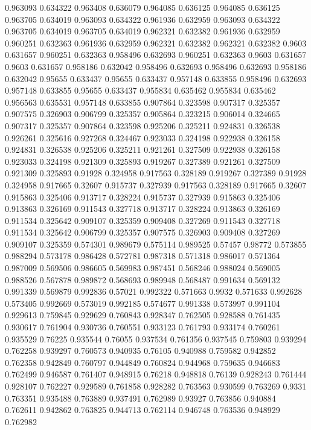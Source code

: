 0.963093 0.634322
0.963408 0.636079
0.964085 0.636125
0.964085 0.636125
0.963705 0.634019
0.963093 0.634322
0.961936 0.632959
0.963093 0.634322
0.963705 0.634019
0.963705 0.634019
0.962321 0.632382
0.961936 0.632959
0.960251 0.632363
0.961936 0.632959
0.962321 0.632382
0.962321 0.632382
0.9603 0.631657
0.960251 0.632363
0.958496 0.632693
0.960251 0.632363
0.9603 0.631657
0.9603 0.631657
0.958186 0.632042
0.958496 0.632693
0.958496 0.632693
0.958186 0.632042
0.95655 0.633437
0.95655 0.633437
0.957148 0.633855
0.958496 0.632693
0.957148 0.633855
0.95655 0.633437
0.955834 0.635462
0.955834 0.635462
0.956563 0.635531
0.957148 0.633855
0.907864 0.323598
0.907317 0.325357
0.907575 0.326903
0.906799 0.325357
0.905864 0.323215
0.906014 0.324665
0.907317 0.325357
0.907864 0.323598
0.925206 0.325211
0.924831 0.326538
0.926261 0.325616
0.927268 0.324467
0.923033 0.324198
0.922938 0.326158
0.924831 0.326538
0.925206 0.325211
0.921261 0.327509
0.922938 0.326158
0.923033 0.324198
0.921309 0.325893
0.919267 0.327389
0.921261 0.327509
0.921309 0.325893
0.91928 0.324958
0.917563 0.328189
0.919267 0.327389
0.91928 0.324958
0.917665 0.32607
0.915737 0.327939
0.917563 0.328189
0.917665 0.32607
0.915863 0.325406
0.913717 0.328224
0.915737 0.327939
0.915863 0.325406
0.913863 0.326169
0.911543 0.327718
0.913717 0.328224
0.913863 0.326169
0.911534 0.325642
0.909107 0.325359
0.909408 0.327269
0.911543 0.327718
0.911534 0.325642
0.906799 0.325357
0.907575 0.326903
0.909408 0.327269
0.909107 0.325359
0.574301 0.989679
0.575114 0.989525
0.57457 0.98772
0.573855 0.988294
0.573178 0.986428
0.572781 0.987318
0.571318 0.986017
0.571364 0.987009
0.569506 0.986605
0.569983 0.987451
0.568246 0.988024
0.569005 0.988526
0.567878 0.989872
0.568693 0.989948
0.568487 0.991634
0.569132 0.991339
0.569879 0.992836
0.57021 0.992322
0.571663 0.9932
0.571633 0.992628
0.573405 0.992669
0.573019 0.992185
0.574677 0.991338
0.573997 0.991104
0.929613 0.759845
0.929629 0.760843
0.928347 0.762505
0.928588 0.761435
0.930617 0.761904
0.930736 0.760551
0.933123 0.761793
0.933174 0.760261
0.935529 0.76225
0.935544 0.76055
0.937534 0.761356
0.937545 0.759803
0.939294 0.762258
0.939297 0.760573
0.940935 0.76105
0.940988 0.759582
0.942852 0.762358
0.942849 0.760797
0.944849 0.760824
0.944968 0.759635
0.946683 0.762499
0.946587 0.761407
0.948915 0.76218
0.948818 0.76139
0.928243 0.761444
0.928107 0.762227
0.929589 0.761858
0.928282 0.763563
0.930599 0.763269
0.9331 0.763351
0.935488 0.763889
0.937491 0.762989
0.93927 0.763856
0.940884 0.762611
0.942862 0.763825
0.944713 0.762114
0.946748 0.763536
0.948929 0.762982
